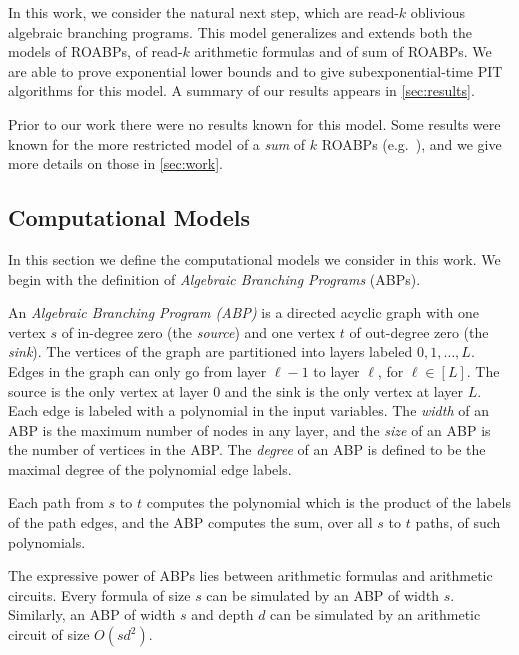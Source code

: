\documentclass[11pt]{article}
\begin{document}
In this work, we consider the natural next step, which are read-$k$ oblivious algebraic branching programs. This model generalizes and extends both the models of ROABPs, of read-$k$ arithmetic formulas and of sum of ROABPs. We are able to prove exponential lower bounds and to give subexponential-time PIT algorithms for this model. A summary of our results appears in \autoref{sec:results}.

Prior to our work there were no results known for this model. Some results were known for the more restricted model of a {\em sum} of $k$ ROABPs (e.g.\ \cite{GKST15}), and we give more details on those in \autoref{sec:work}.




\subsection{Computational Models}
\label{sec:models}
In this section we define the computational models we consider in this work. We begin with the definition of {\em Algebraic Branching Programs} (ABPs).

\begin{definition}
\label{def:abp}
An {\em Algebraic Branching Program (ABP)} is a directed acyclic graph with one vertex $s$ of in-degree zero (the {\em source}) and
one vertex $t$ of out-degree zero (the {\em sink}). The vertices of the graph are partitioned into layers labeled $0, 1, \ldots, L$. Edges in the graph can only go from layer $\ell-1$ to layer $\ell$, for $\ell \in [L]$. The source is the only vertex at layer $0$ and the sink is the only vertex at layer $L$. Each edge is labeled with a polynomial in the input variables. The {\em width} of an ABP is the maximum number of nodes in any layer, and the {\em size} of an ABP is the number of vertices in the ABP. The {\em degree} of an ABP is defined to be the maximal degree of the polynomial edge labels.
	
Each path from $s$ to $t$ computes the polynomial which is the product of the labels of the path edges, and the ABP 
computes the sum, over all $s$ to $t$ paths, of such polynomials.  
\end{definition}

The expressive power of ABPs lies between arithmetic formulas and arithmetic circuits. Every formula of size $s$ can be simulated by an ABP of width $s$. Similarly, an ABP of width $s$ and depth $d$ can be simulated by an arithmetic circuit of size $O(sd^2)$. 
\end{document}
